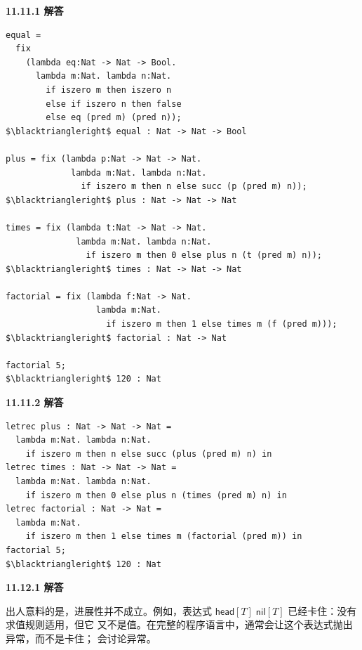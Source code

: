 \begin{taplauthorsolutionentrybox}
\label{sol:author:11.11.1}
\textbf{11.11.1 解答}

\begin{lstlisting}[mathescape=true]
equal =
  fix
    (lambda eq:Nat -> Nat -> Bool.
      lambda m:Nat. lambda n:Nat.
        if iszero m then iszero n
        else if iszero n then false
        else eq (pred m) (pred n));
$\blacktriangleright$ equal : Nat -> Nat -> Bool

plus = fix (lambda p:Nat -> Nat -> Nat.
             lambda m:Nat. lambda n:Nat.
               if iszero m then n else succ (p (pred m) n));
$\blacktriangleright$ plus : Nat -> Nat -> Nat

times = fix (lambda t:Nat -> Nat -> Nat.
              lambda m:Nat. lambda n:Nat.
                if iszero m then 0 else plus n (t (pred m) n));
$\blacktriangleright$ times : Nat -> Nat -> Nat

factorial = fix (lambda f:Nat -> Nat.
                  lambda m:Nat.
                    if iszero m then 1 else times m (f (pred m)));
$\blacktriangleright$ factorial : Nat -> Nat

factorial 5;
$\blacktriangleright$ 120 : Nat
\end{lstlisting}

\end{taplauthorsolutionentrybox}

\begin{taplauthorsolutionentrybox}
\label{sol:author:11.11.2}
\textbf{11.11.2 解答}

\begin{lstlisting}[mathescape=true]
letrec plus : Nat -> Nat -> Nat =
  lambda m:Nat. lambda n:Nat.
    if iszero m then n else succ (plus (pred m) n) in
letrec times : Nat -> Nat -> Nat =
  lambda m:Nat. lambda n:Nat.
    if iszero m then 0 else plus n (times (pred m) n) in
letrec factorial : Nat -> Nat =
  lambda m:Nat.
    if iszero m then 1 else times m (factorial (pred m)) in
factorial 5;
$\blacktriangleright$ 120 : Nat
\end{lstlisting}

\end{taplauthorsolutionentrybox}

\begin{taplauthorsolutionentrybox}
\label{sol:author:11.12.1}
\textbf{11.12.1 解答}

出人意料的是，进展性并不成立。例如，表达式
\(\mathsf{head}[T]\;\mathsf{nil}[T]\) 已经卡住：没有求值规则适用，但它
又不是值。在完整的程序语言中，通常会让这个表达式抛出异常，而不是卡住；
会讨论异常。

\end{taplauthorsolutionentrybox}

